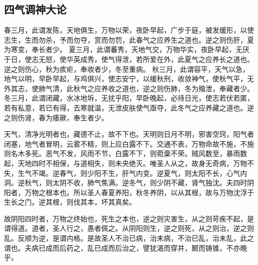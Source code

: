 \subsection{四气调神大论}

春三月，此谓发陈，天地俱生，万物以荣，夜卧早起，广步于庭，被发缓形，以使志生，生而勿杀，予而勿夺，赏而勿罚，此春气之应养生之道也。逆之则伤肝，夏为寒变，奉长者少。
夏三月，此谓蕃秀，天地气交，万物华实，夜卧早起，无厌于日，使志无怒，使华英成秀，使气得泄，若所爱在外，此夏气之应养长之道也。逆之则伤心，秋为痎疟，奉收者少，冬至重病。
秋三月，此谓容平，天气以急，地气以明，早卧早起，与鸡俱兴，使志安宁，以缓秋刑，收敛神气，使秋气平，无外其志，使肺气清，此秋气之应养收之道也，逆之则伤肺，冬为飱泄，奉藏者少。
冬三月，此谓闭藏，水冰地坼，无扰乎阳，早卧晚起，必待日光，使志若伏若匿，若有私意，若已有得，去寒就温，无泄皮肤使气亟夺，此冬气之应养藏之道也。逆之则伤肾，春为痿厥，奉生者少。

天气，清净光明者也，藏德不止，故不下也。天明则日月不明，邪害空窍，阳气者闭塞，地气者冒明，云雾不精，则上应白露不下。交通不表，万物命故不施，不施则名木多死。恶气不发，风雨不节，白露不下，则菀稾不荣。贼风数至，暴雨数起，天地四时不相保，与道相失，则未央绝灭。唯圣人从之，故身无奇病，万物不失，生气不竭。逆春气，则少阳不生，肝气内变。逆夏气，则太阳不长，心气内洞。逆秋气，则太阴不收，肺气焦满。逆冬气，则少阴不藏，肾气独沈。夫四时阴阳者，万物之根本也。所以圣人春夏养阳，秋冬养阴，以从其根，故与万物沈浮于生长之门。逆其根，则伐其本，坏其真矣。

故阴阳四时者，万物之终始也，死生之本也，逆之则灾害生，从之则苛疾不起，是谓得道。道者，圣人行之，愚者佩之。从阴阳则生，逆之则死，从之则治，逆之则乱。反顺为逆，是谓内格。是故圣人不治已病，治未病，不治已乱，治未乱，此之谓也。夫病已成而后药之，乱已成而后治之，譬犹渴而穿井，鬭而铸锥，不亦晚乎。